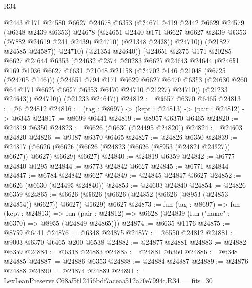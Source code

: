 \begin{lexlean}{R34}
\begin{coremodule}
                  @2443
                  @171
                  @24580
                  @6627
                  @24678
                  @6353
                  (@24671
                    @419
                    @2442
                    @6629
                    @24579
                    (@6348 @2439 @6353)
                    @24678
                    (@24651 @2440 @171 @6627 @6627 @2439 @6353 (@7882 @24619 @241 @2439) @24710)
                    (@21348 @2438))
                  @24710))
              (@21827 @24585 @24587))
            @24710)
          (@21354 @24640))
        (@24651
          @2375
          @171
          @20285
          @6627
          @24644
          @6353
          (@24632
            @2374
            @20283
            @6627
            @24643
            @24644
            (@24651
              @169
              @1036
              @6627
              @6631
              @21048
              @21158
              (@24702 @146 @21048 (@6725 (@24705 @146)))
              (@24651
                @794
                @171
                @6629
                @6627
                @6470
                @6353
                (@24630 @260 @64 @171 @6627 @6627 @6353 @6470 @24710 @21227)
                @24710))
            (@21233 @24643))
          @24710))
      (@21233 @24647))
@24812 := @6657 @6370 @6465
@24813 := @6 @24812
@24816 := (tag : @8697) -> (kept : @24813) -> (pair : @24812) -> @6345
@24817 := @8699 @6441
@24819 := @8957 @6370 @6465
@24820 := @24819 @6350
@24823 := @6626 (@6630 (@24495 @24820))
@24824 := @24603 @24820
@24826 := @9087 @6370 @6465
@24827 := @24826 @6350
@24839 := @24817
    (@6626 (@6626 (@6626 (@24823 (@6626 (@8953 (@24824 @24827)) @6627)) @6627) @6629) @6627)
@24840 := @24819 @6359
@24842 := @6777 @24840 @1295
@24844 := @6773 @24842 @6627
@24845 := @6771 @24844
@24847 := @6784 @24842 @6627
@24849 := @24845 @24847 @6627
@24852 := @6626 (@6630 (@24495 @24840))
@24853 := @24603 @24840
@24854 := @24826 @6359
@24865 := @6626 (@6626 (@6626 (@24852 (@6626 (@8953 (@24853 @24854)) @6627)) @6627) @6629) @6627
@24873 := fun (tag : @8697) =>
  fun (kept : @24813) =>
  fun (pair : @24812) => @6628 (@24839 (fun ("name" : @6370) => @8955 (@24849 @24865)))
@24874 := @6635 @1176
@24875 := @8759 @6441
@24876 := @6348 @24875
@24877 := @6550 @24812
@24881 := @9003 @6370 @6465 @200 @6538
@24882 := @24877 @24881
@24883 := @24882 @6359
@24884 := @6348 @24883
@24885 := @24881 @6350
@24886 := @6348 @24885
@24887 := @24886 @6353
@24888 := @24884 @24887
@24889 := @24876 @24888
@24890 := @24874 @24889
@24891 := LexLeanPreserve.C68af5f12456bdf7aceaa512a70e7994c.R34.__fits_30

\end{coremodule}
\end{lexlean}
